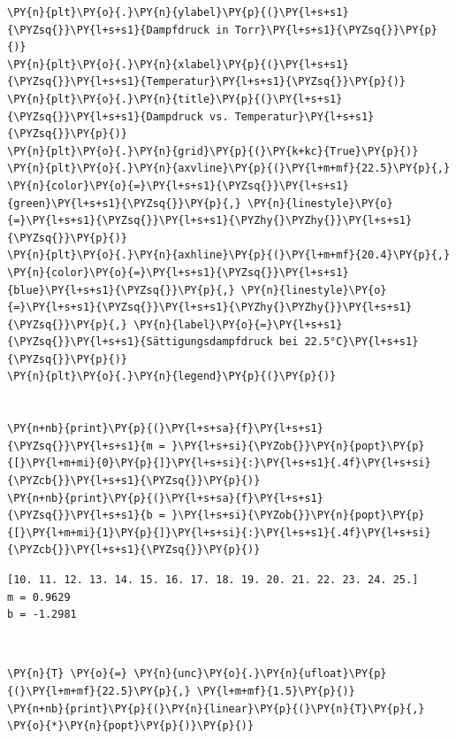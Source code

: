 \begin{tcolorbox}[breakable, size=fbox, boxrule=1pt, pad at break*=1mm,colback=cellbackground, colframe=cellborder]
\begin{Verbatim}[commandchars=\\\{\}]
\PY{n}{plt}\PY{o}{.}\PY{n}{ylabel}\PY{p}{(}\PY{l+s+s1}{\PYZsq{}}\PY{l+s+s1}{Dampfdruck in Torr}\PY{l+s+s1}{\PYZsq{}}\PY{p}{)}
\PY{n}{plt}\PY{o}{.}\PY{n}{xlabel}\PY{p}{(}\PY{l+s+s1}{\PYZsq{}}\PY{l+s+s1}{Temperatur}\PY{l+s+s1}{\PYZsq{}}\PY{p}{)}
\PY{n}{plt}\PY{o}{.}\PY{n}{title}\PY{p}{(}\PY{l+s+s1}{\PYZsq{}}\PY{l+s+s1}{Dampdruck vs. Temperatur}\PY{l+s+s1}{\PYZsq{}}\PY{p}{)}
\PY{n}{plt}\PY{o}{.}\PY{n}{grid}\PY{p}{(}\PY{k+kc}{True}\PY{p}{)}
\PY{n}{plt}\PY{o}{.}\PY{n}{axvline}\PY{p}{(}\PY{l+m+mf}{22.5}\PY{p}{,} \PY{n}{color}\PY{o}{=}\PY{l+s+s1}{\PYZsq{}}\PY{l+s+s1}{green}\PY{l+s+s1}{\PYZsq{}}\PY{p}{,} \PY{n}{linestyle}\PY{o}{=}\PY{l+s+s1}{\PYZsq{}}\PY{l+s+s1}{\PYZhy{}\PYZhy{}}\PY{l+s+s1}{\PYZsq{}}\PY{p}{)}
\PY{n}{plt}\PY{o}{.}\PY{n}{axhline}\PY{p}{(}\PY{l+m+mf}{20.4}\PY{p}{,} \PY{n}{color}\PY{o}{=}\PY{l+s+s1}{\PYZsq{}}\PY{l+s+s1}{blue}\PY{l+s+s1}{\PYZsq{}}\PY{p}{,} \PY{n}{linestyle}\PY{o}{=}\PY{l+s+s1}{\PYZsq{}}\PY{l+s+s1}{\PYZhy{}\PYZhy{}}\PY{l+s+s1}{\PYZsq{}}\PY{p}{,} \PY{n}{label}\PY{o}{=}\PY{l+s+s1}{\PYZsq{}}\PY{l+s+s1}{Sättigungsdampfdruck bei 22.5°C}\PY{l+s+s1}{\PYZsq{}}\PY{p}{)}
\PY{n}{plt}\PY{o}{.}\PY{n}{legend}\PY{p}{(}\PY{p}{)}


\PY{n+nb}{print}\PY{p}{(}\PY{l+s+sa}{f}\PY{l+s+s1}{\PYZsq{}}\PY{l+s+s1}{m = }\PY{l+s+si}{\PYZob{}}\PY{n}{popt}\PY{p}{[}\PY{l+m+mi}{0}\PY{p}{]}\PY{l+s+si}{:}\PY{l+s+s1}{.4f}\PY{l+s+si}{\PYZcb{}}\PY{l+s+s1}{\PYZsq{}}\PY{p}{)}
\PY{n+nb}{print}\PY{p}{(}\PY{l+s+sa}{f}\PY{l+s+s1}{\PYZsq{}}\PY{l+s+s1}{b = }\PY{l+s+si}{\PYZob{}}\PY{n}{popt}\PY{p}{[}\PY{l+m+mi}{1}\PY{p}{]}\PY{l+s+si}{:}\PY{l+s+s1}{.4f}\PY{l+s+si}{\PYZcb{}}\PY{l+s+s1}{\PYZsq{}}\PY{p}{)}
\end{Verbatim}
\end{tcolorbox}

    \begin{Verbatim}[commandchars=\\\{\}]
[10. 11. 12. 13. 14. 15. 16. 17. 18. 19. 20. 21. 22. 23. 24. 25.]
m = 0.9629
b = -1.2981
    \end{Verbatim}

    \begin{center}
    \end{center}
    { \hspace*{\fill} \\}
    
    \begin{tcolorbox}[breakable, size=fbox, boxrule=1pt, pad at break*=1mm,colback=cellbackground, colframe=cellborder]
\begin{Verbatim}[commandchars=\\\{\}]
\PY{n}{T} \PY{o}{=} \PY{n}{unc}\PY{o}{.}\PY{n}{ufloat}\PY{p}{(}\PY{l+m+mf}{22.5}\PY{p}{,} \PY{l+m+mf}{1.5}\PY{p}{)}
\PY{n+nb}{print}\PY{p}{(}\PY{n}{linear}\PY{p}{(}\PY{n}{T}\PY{p}{,} \PY{o}{*}\PY{n}{popt}\PY{p}{)}\PY{p}{)}
\end{Verbatim}
\end{tcolorbox}

